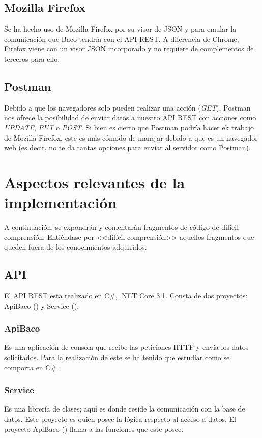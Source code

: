 \documentclass[12pt, a4paper]{book} %
\begin{document}
			\subsection{Mozilla Firefox}
			Se ha hecho uso de Mozilla Firefox por su visor de JSON y para emular la comunicación que Baco tendría con el API REST. A diferencia de Chrome, Firefox viene con un visor JSON incorporado y no requiere de complementos de terceros para ello.
			\subsection{Postman}
			Debido a que los navegadores solo pueden realizar una acción (\textit{GET}), Postman nos ofrece la posibilidad de enviar datos a nuestro API REST con acciones como \textit{UPDATE}, \textit{PUT} o \textit{POST}. Si bien es cierto que Postman podría hacer ek trabajo de Mozilla Firefox, este es más cómodo de manejar debido a que es un navegador web (es decir, no te da tantas opciones para enviar al servidor como Postman).
		\section{Aspectos relevantes de la implementación}
		A continuación, se expondrán y comentarán fragmentos de código de difícil comprensión. Entiéndase por <<difícil comprensión>> aquellos fragmentos que queden fuera de los conocimientos adquiridos.
			\subsection{API}
			El API REST esta realizado en C\#, .NET Core 3.1. Consta de dos proyectos: ApiBaco () y Service ().
				\subsubsection{ApiBaco} \label{sbc:api}
				Es una aplicación de consola que recibe las peticiones HTTP y envía los datos solicitados. Para la realización de este se ha tenido que estudiar como se comporta en C\# \cite{Learn_Entity_Framework_Core}.
				\subsubsection{Service} \label{sbc:service}
				Es una librería de clases; aquí es donde reside la comunicación con la base de datos. Este proyecto es quien posee la lógica respecto al acceso a datos. El proyecto ApiBaco () llama a las funciones que este posee.
\end{document}
